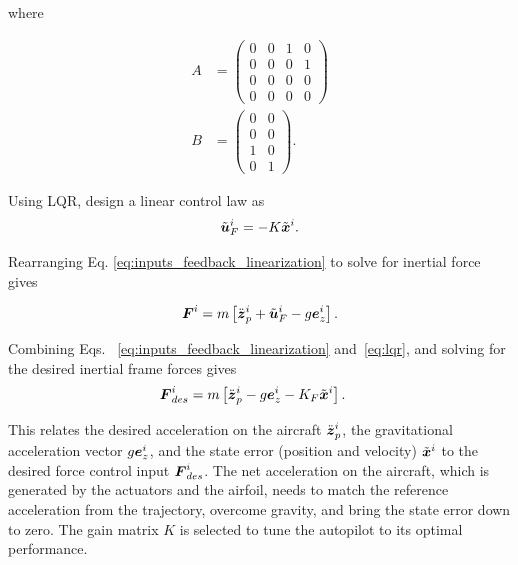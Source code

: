 where

\begin{align*}
    A &= \begin{pmatrix} 
            0 & 0 & 1 & 0  \\
            0 & 0 & 0 & 1 \\
            0 & 0 & 0 & 0 \\
            0 & 0 & 0 & 0
         \end{pmatrix} \\
    B &= \begin{pmatrix} 
            0 & 0  \\
            0 & 0  \\
            1 & 0  \\
            0 & 1  
         \end{pmatrix}
    .
\end{align*}

Using LQR, design a linear control law as
\begin{equation}\label{eq:lqr}
    \tilde{\boldsymbol{u}}_F^i = -K \tilde{\boldsymbol{x}}^i.
\end{equation}

Rearranging Eq. \ref{eq:inputs_feedback_linearization} to solve for inertial force gives

\begin{align}
    \boldsymbol{F}^i = m \left[\ddot{\boldsymbol{z}}_{p}^i + \tilde{\boldsymbol{u}}_F^i - g \boldsymbol{e}_z^i\right].
\end{align}

Combining Eqs. ~\eqref{eq:inputs_feedback_linearization} and~\eqref{eq:lqr}, and solving for the desired inertial frame forces gives
\begin{subequations}
\label{eq:input_final}
\begin{align}
    \boldsymbol{F}_{des}^i &= m\left[\ddot{\boldsymbol{z}}_p^i - g\boldsymbol{e}_z^i -K_F\tilde{\boldsymbol{x}}^i \right].
\end{align}
\end{subequations}

This relates the desired acceleration on the aircraft $\ddot{\boldsymbol{z}}_p^i$, the gravitational acceleration vector $g\boldsymbol{e}_z^i$, and the state error (position and velocity) $\tilde{\boldsymbol{x}}^i$ to the desired force control input $\boldsymbol{F}_{des}^i$. 
The net acceleration on the aircraft, which is generated by the actuators and the airfoil, needs to match the reference acceleration from the trajectory, overcome gravity, and bring the state error down to zero. 
The gain matrix $K$ is selected to tune the autopilot to its optimal performance. 

